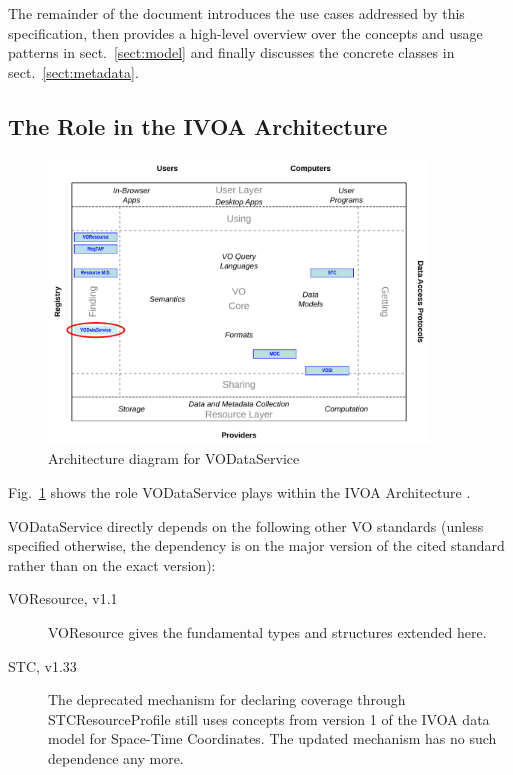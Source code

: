 \documentclass[11pt,a4paper]{ivoa}
\begin{document}
The remainder of the document introduces the use cases addressed by this
specification, then provides a high-level overview over the concepts and
usage patterns in sect.~\ref{sect:model} and finally discusses the
concrete classes in sect.~\ref{sect:metadata}.


\subsection{The Role in the IVOA Architecture}

\begin{figure}
\centering
\includegraphics[width=0.9\textwidth]{role_diagram.pdf}
\caption{Architecture diagram for VODataService}
\label{fig:archdiag}
\end{figure}

Fig.~\ref{fig:archdiag} shows the role VODataService plays within the
IVOA Architecture \citep{2021ivoa.spec.1101D}.

VODataService directly depends on the following other VO standards
(unless specified otherwise, the dependency is on the major version of
the cited standard rather than on the exact version):

\begin{description}
\item[VOResource, v1.1 \citep{2018ivoa.spec.0625P}] VOResource gives
the fundamental types and structures extended here.
\item[STC, v1.33 \citep{2007ivoa.spec.1030R}] The deprecated mechanism
for declaring coverage through STCResourceProfile still uses concepts
from version 1 of the IVOA data model for Space-Time Coordinates.  The
updated mechanism has no such dependence any more.
\end{description}
\end{document}
